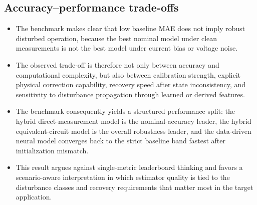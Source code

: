 \documentclass[review,nopreprintline]{elsarticle}
\begin{document}
\subsection{Accuracy--performance trade-offs}
\begin{itemize}[leftmargin=*]
    \item The benchmark makes clear that low baseline MAE does not imply robust disturbed operation, because the best nominal model under clean measurements is not the best model under current bias or voltage noise.
    \item The observed trade-off is therefore not only between accuracy and computational complexity, but also between calibration strength, explicit physical correction capability, recovery speed after state inconsistency, and sensitivity to disturbance propagation through learned or derived features.
    \item The benchmark consequently yields a structured performance split: the hybrid direct-measurement model is the nominal-accuracy leader, the hybrid equivalent-circuit model is the overall robustness leader, and the data-driven neural model converges back to the strict baseline band fastest after initialization mismatch.
    \item This result argues against single-metric leaderboard thinking and favors a scenario-aware interpretation in which estimator quality is tied to the disturbance classes and recovery requirements that matter most in the target application.
\end{itemize}
\end{document}
